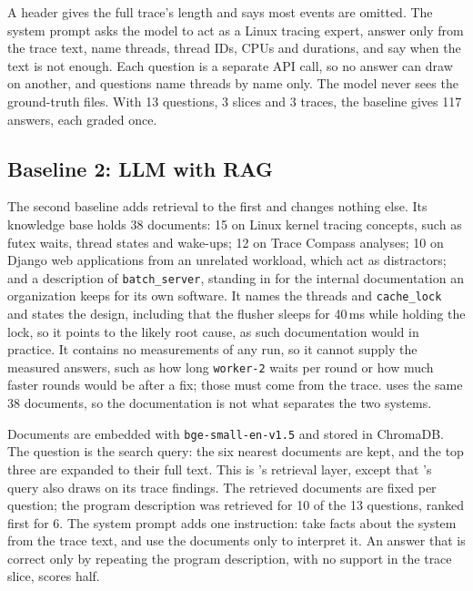 A header gives the full trace's length and says most events are omitted.
The system prompt asks the model to act as a Linux tracing expert, answer
only from the trace text, name threads, thread IDs, CPUs and durations,
and say when the text is not enough. Each question is a separate API call,
so no answer can draw on another, and questions name threads by name only.
The model never sees the ground-truth files. With 13 questions, 3 slices
and 3 traces, the baseline gives 117 answers, each graded once.

\subsection{Baseline 2: LLM with RAG}

The second baseline adds retrieval to the first and changes nothing else.
Its knowledge base holds 38 documents: 15 on Linux kernel tracing concepts,
such as futex waits, thread states and wake-ups; 12 on Trace Compass
analyses; 10 on Django web applications from an unrelated workload, which
act as distractors; and a description of \texttt{batch\_server}, standing
in for the internal documentation an organization keeps for its own
software. It names the threads and \texttt{cache\_lock} and states the
design, including that the flusher sleeps for 40\,ms while holding the
lock, so it points to the likely root cause, as such documentation would in
practice. It contains no measurements of any run, so it cannot supply the
measured answers, such as how long \texttt{worker-2} waits per round or how
much faster rounds would be after a fix; those must come from the trace.
\sysname uses the same 38 documents, so the documentation is not what
separates the two systems.

Documents are embedded with \texttt{bge-small-en-v1.5} and stored in
ChromaDB. The question is the search query: the six nearest documents are
kept, and the top three are expanded to their full text. This is
\sysname's retrieval layer, except that \sysname's query also draws on its
trace findings. The retrieved documents are fixed per question; the program
description was retrieved for 10 of the 13 questions, ranked first for 6.
The system prompt adds one instruction: take facts about the system from
the trace text, and use the documents only to interpret it. An answer that
is correct only by repeating the program description, with no support in
the trace slice, scores half.

\subsection{\sysname}

